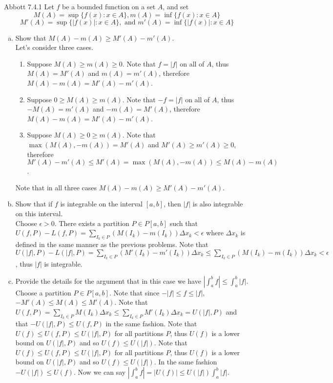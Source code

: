 \documentclass[12pt]{article}
\makeatletter
\theoremstyle{homework}
\newenvironment{exercise}[1]
{\def\@currentlabel{#1}\exercisecore}
{\endexercisecore}
\makeatother
\begin{document}
\begin{exercise}
5
Abbott 7.4.1
\end{exercise}
Let $f$ be a bounded function on a set $A$, and set $$M(A) = \sup \{f(x) : x \in A \}, m(A) = \inf \{f(x): x\in A\}$$ $$M'(A) = \sup\{|f(x)| : x \in A \}, \text{ and } m'(A)=\inf\{|f(x)| : x \in A \}$$
\begin{enumerate}[(a)] 
\item Show that $M(A) - m(A) \ge M'(A) - m'(A)$.\\
Let's consider three cases.
\begin{enumerate}[(1)]
\item Suppose $M(A)\geq m(A)\geq 0$.  Note that $f=|f|$ on all of $A$, thus $M(A)=M'(A)$ and $m(A)=m'(A)$, therefore $M(A) - m(A) = M'(A) - m'(A)$.
\item Suppose $0\geq M(A)\geq m(A)$.  Note that $-f=|f|$ on all of $A$, thus $-M(A)=m'(A)$ and $-m(A)=M'(A)$, therefore $M(A) - m(A) = M'(A) - m'(A)$.
\item Suppose $M(A)\geq 0\geq m(A)$.  Note that $\max(M(A),-m(A))=M'(A)$ and $M'(A) \geq m'(A)\geq 0$, therefore $M'(A) - m'(A)\leq M'(A)=\max(M(A),-m(A))\leq M(A) - m(A)$.

\end{enumerate}
Note that in all three cases $M(A) - m(A) \ge M'(A) - m'(A)$.
\item Show that if $f$ is integrable on the interval $[a,b]$, then $|f|$ is also integrable on this interval.\\
Choose $\epsilon>0$.  There exists a partition $P\in P[a,b]$ such that $U(f,P)-L(f,P)=\sum_{I_k\in P} (M(I_k)-m(I_k))\Delta x_k<\epsilon$ where $\Delta x_k$ is defined in the same manner as the previous problems.  Note that $U(|f|,P)-L(|f|,P)=\sum_{I_k\in P} (M'(I_k)-m'(I_k))\Delta x_k\leq \sum_{I_k\in P} (M(I_k)-m(I_k))\Delta x_k <\epsilon$, thus $|f|$ is integrable.
\item Provide the details for the argument that in this case we have $|\int_{a}^{b}f| \le \int_{a}^{b} |f|$.\\
Choose a partition $P\in P[a,b]$.  Note that since $-|f|\leq f\leq |f|$, $-M'(A) \leq M(A)\leq M'(A)$.  Note that $U(f,P)= \sum_{I_k\in P} M(I_k)\Delta x_k\leq\sum_{I_k\in P} M'(I_k)\Delta x_k=U(|f|,P)$ and that $-U(|f|,P)\leq U(f,P)$ in the same fashion.  Note that $U(f)\leq U(f,P) \leq U(|f|,P)$ for all partitions $P$, thus $U(f)$ is a lower bound on $U(|f|,P)$ and so $U(f)\leq U(|f|)$.  Note that $U(f)\leq U(f,P) \leq U(|f|,P)$ for all partitions $P$, thus $U(f)$ is a lower bound on $U(|f|,P)$ and so $U(f)\leq U(|f|)$.  In the same fashion $-U(|f|)\leq U(f)$.  Now we can say $|\int_{a}^{b}f|=|U(f)| \le U(|f|) \int_{a}^{b} |f|$.
\end{enumerate}
\end{document}
